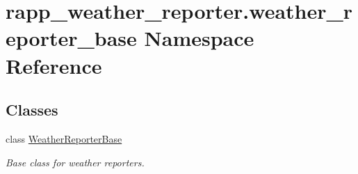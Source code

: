 \hypertarget{namespacerapp__weather__reporter_1_1weather__reporter__base}{\section{rapp\-\_\-weather\-\_\-reporter.\-weather\-\_\-reporter\-\_\-base Namespace Reference}
\label{namespacerapp__weather__reporter_1_1weather__reporter__base}
}
\subsection*{Classes}
\begin{DoxyCompactItemize}
\item 
class \hyperlink{classrapp__weather__reporter_1_1weather__reporter__base_1_1WeatherReporterBase}{Weather\-Reporter\-Base}
\begin{DoxyCompactList}\small\item\em Base class for weather reporters. \end{DoxyCompactList}\end{DoxyCompactItemize}
